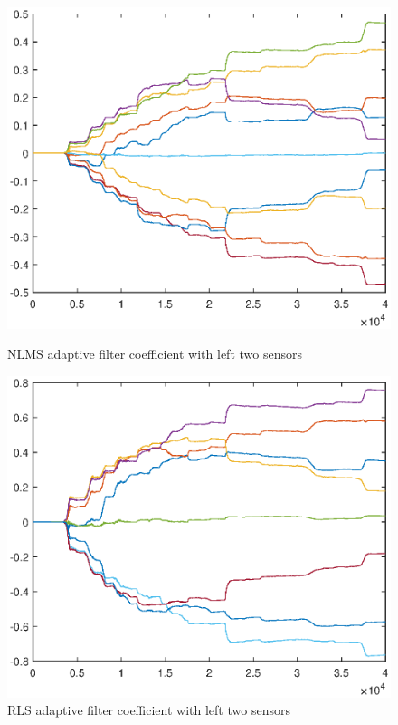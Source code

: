 \documentclass[onecolumn, conference]{IEEEtran}
\begin{document}
\begin{figure}[htbp]
	\begin{minipage}[b]{0.5\linewidth}
	\centerline{\includegraphics[width=1\textwidth]{img/NLMS_2sensor.eps}}
	\caption{NLMS adaptive filter coefficient with left two sensors}
	\label{NLMS adaptive filter coefficient with left two sensors}
	\end{minipage}
	\hfill
	\begin{minipage}[b]{0.5\linewidth}
	\centerline{\includegraphics[width=1\textwidth]{img/RLS_2sensor.eps}}
	\caption{RLS adaptive filter coefficient with left two sensors}
	\label{RLS adaptive filter coefficient with left two sensors}
	\end{minipage}
\end{figure}
\end{document}
